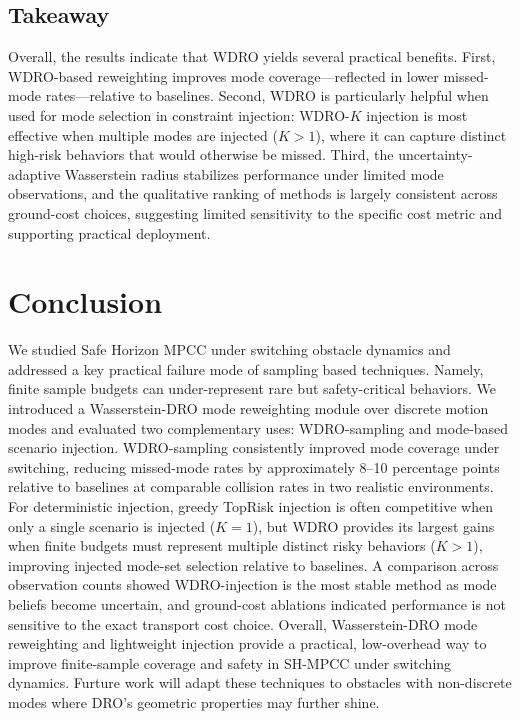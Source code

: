 \documentclass[letterpaper,10pt,conference]{ieeeconf}
\begin{document}
\subsection{Takeaway}
Overall, the results indicate that WDRO yields several practical benefits. 
First, WDRO-based reweighting improves mode coverage---reflected in lower missed-mode rates---relative to baselines.
Second, WDRO is particularly helpful when used for mode selection in constraint injection: WDRO-$K$ injection is most effective when multiple modes are injected ($K>1$), where it can capture distinct high-risk behaviors that would otherwise be missed.
Third, the uncertainty-adaptive Wasserstein radius stabilizes performance under limited mode observations, and the qualitative ranking of methods is largely consistent across ground-cost choices, suggesting limited sensitivity to the specific cost metric and supporting practical deployment.


\section{Conclusion}\label{conclusion}

We studied Safe Horizon MPCC under switching obstacle dynamics and addressed a key practical failure mode of sampling based techniques. Namely, finite sample budgets can under-represent rare but safety-critical behaviors. We introduced a Wasserstein-DRO mode reweighting module over discrete motion modes and evaluated two complementary uses: WDRO-sampling and mode-based scenario injection.
WDRO-sampling consistently improved mode coverage under switching, reducing missed-mode rates by approximately 8--10 percentage points relative to baselines at comparable collision rates in two realistic environments.
For deterministic injection, greedy TopRisk injection is often competitive when only a single scenario is injected ($K=1$), but WDRO provides its largest gains when finite budgets must represent multiple distinct risky behaviors ($K>1$), improving injected mode-set selection relative to baselines.
A comparison across observation counts showed WDRO-injection is the most stable method as mode beliefs become uncertain, and ground-cost ablations indicated performance is not sensitive to the exact transport cost choice.
Overall, Wasserstein-DRO mode reweighting and lightweight injection provide a practical, low-overhead way to improve finite-sample coverage and safety in SH-MPCC under switching dynamics. Furture work will adapt these techniques to obstacles with non-discrete modes where DRO's geometric properties may further shine.



\end{document}
